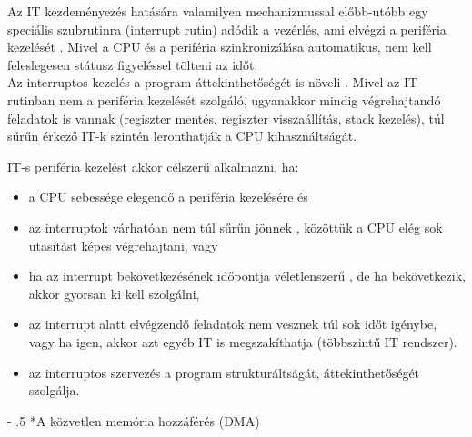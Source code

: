 \documentclass[tikz,12pt,margin=0px]{article}
\makeatletter
\renewcommand\paragraph{%
	\@startsection{paragraph}{4}{0mm}%
	{-\baselineskip}%
	{.5\baselineskip}%
	{\normalfont\normalsize\bfseries}}
\makeatother
\begin{document}
    \noindent Az IT kezdeményezés hatására valamilyen mechanizmussal előbb-utóbb egy speciális szubrutinra (interrupt rutin) adódik a vezérlés, ami elvégzi a periféria kezelését . Mivel a CPU és a periféria szinkronizálása automatikus, nem kell feleslegesen státusz figyeléssel tölteni az időt.\\

    \noindent Az interruptos kezelés a program áttekinthetőségét is növeli . Mivel az IT rutinban nem a periféria kezelését szolgáló, ugyanakkor mindig végrehajtandó feladatok is vannak (regiszter mentés, regiszter visszaállítás, stack kezelés), túl sűrűn érkező IT-k szintén leronthatják a CPU kihasználtságát.

    \noindent IT-s periféria kezelést akkor célszerű alkalmazni, ha:
    \begin{itemize}[topsep=8pt,itemsep=4pt,partopsep=4pt, parsep=4pt]
        \item a CPU sebessége elegendő a periféria kezelésére és
        \item az interruptok várhatóan nem túl sűrűn jönnek , közöttük a CPU elég sok utasítást képes végrehajtani, vagy
        \item ha az interrupt bekövetkezésének időpontja véletlenszerű , de ha bekövetkezik, akkor gyorsan ki kell szolgálni,
        \item az interrupt alatt elvégzendő feladatok nem vesznek túl sok időt igénybe, vagy ha igen, akkor azt egyéb IT is megszakíthatja (többszintű IT rendszer).
        \item az interruptos szervezés a program strukturáltságát, áttekinthetőségét szolgálja.
    \end{itemize}

    \paragraph*{A közvetlen memória hozzáférés (DMA)}
\end{document}
